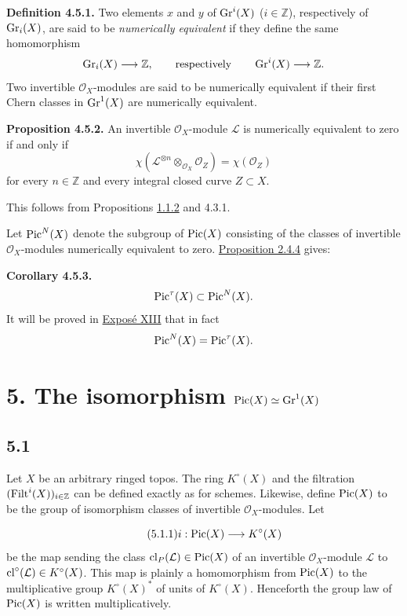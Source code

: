 \textbf{Definition 4.5.1.}
Two elements $x$ and $y$ of $\operatorname{Gr}^i(X)$ ($i\in\mathbb Z$), respectively of
$\operatorname{Gr}_i(X)$, are said to be \emph{numerically equivalent} if they define the
same homomorphism
\[
\operatorname{Gr}_i(X)\longrightarrow\mathbb Z,
\qquad\text{respectively}\qquad
\operatorname{Gr}^i(X)\longrightarrow\mathbb Z.
\]
Two invertible $\mathcal O_X$-modules are said to be numerically equivalent
if their first Chern classes in $\operatorname{Gr}^1(X)$ are numerically equivalent.

\textbf{Proposition 4.5.2.}
An invertible $\mathcal O_X$-module $\mathcal L$ is numerically equivalent to
zero if and only if
\begin{equation}\tag{4.5.3}
\chi(\mathcal L^{\otimes n}\otimes_{\mathcal O_X}\mathcal O_Z)
=\chi(\mathcal O_Z)
\end{equation}
for every $n\in\mathbb Z$ and every integral closed curve $Z\subset X$.

This follows from Propositions \hyperlink{sga6.e10.prop.1-1-2}{1.1.2} and 4.3.1.

Let $\operatorname{Pic}^N(X)$ denote the subgroup of $\operatorname{Pic}(X)$ consisting of the classes of
invertible $\mathcal O_X$-modules numerically equivalent to zero.
\hyperlink{sga6.e10.prop.2-4-4}{Proposition 2.4.4} gives:

\textbf{Corollary 4.5.3.}
\[
\operatorname{Pic}^\tau(X)\subset\operatorname{Pic}^N(X).
\]
It will be proved in \hyperlink{sga6.e13.expose}{Expos\'e XIII} that in fact
\[
\operatorname{Pic}^N(X)=\operatorname{Pic}^\tau(X).
\]

\section*{5. The isomorphism $\operatorname{Pic}(X)\simeq\operatorname{Gr}^1(X)$}

\subsection*{5.1}
Let $X$ be an arbitrary ringed topos. The ring $K^\circ(X)$ and the
filtration $(\operatorname{Filt}^i(X))_{i\in\mathbb Z}$ can be defined exactly as for
schemes. Likewise, define $\operatorname{Pic}(X)$ to be the group of isomorphism classes of
invertible $\mathcal O_X$-modules. Let

\begin{equation}\tag{5.1.1}
i:\operatorname{Pic}(X)\longrightarrow K^\circ(X)
\end{equation}
be the map sending the class $\operatorname{cl}_P(\mathcal L)\in\operatorname{Pic}(X)$ of an invertible
$\mathcal O_X$-module $\mathcal L$ to
$\operatorname{cl}^\circ(\mathcal L)\in K^\circ(X)$. This map is plainly a homomorphism
from $\operatorname{Pic}(X)$ to the multiplicative group $K^\circ(X)^*$ of units of
$K^\circ(X)$. Henceforth the group law of $\operatorname{Pic}(X)$ is written
multiplicatively.

